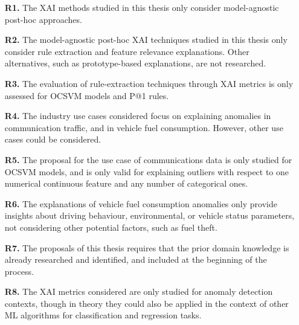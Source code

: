 \begin{itemize}
\item[\textbf{R1.}] The XAI methods studied in this thesis only consider model-agnostic post-hoc approaches.

\item[\textbf{R2.}] The model-agnostic post-hoc XAI techniques studied in this thesis only consider rule extraction and feature relevance explanations. Other alternatives, such as prototype-based explanations, are not researched.

\item[\textbf{R3.}] The evaluation of rule-extraction techniques through XAI metrics is only assessed for OCSVM models and P@1 rules.

\item[\textbf{R4.}] The industry use cases considered focus on explaining anomalies in communication traffic, and in vehicle fuel consumption. However, other use cases could be considered.

\item[\textbf{R5.}] The proposal for the use case of communications data is only studied for OCSVM models, and is only valid for explaining outliers with respect to one numerical continuous feature and any number of categorical ones.

\item[\textbf{R6.}] The explanations of vehicle fuel consumption anomalies only provide insights about driving behaviour, environmental, or vehicle status parameters, not considering other potential factors, such as fuel theft.

\item[\textbf{R7.}] The proposals of this thesis requires that the prior domain knowledge is already researched and identified, and included at the beginning of the process.

\item[\textbf{R8.}] The XAI metrics considered are only studied for anomaly detection contexts, though in theory they could also be applied in the context of other ML algorithms for classification and regression tasks.

\end{itemize}


